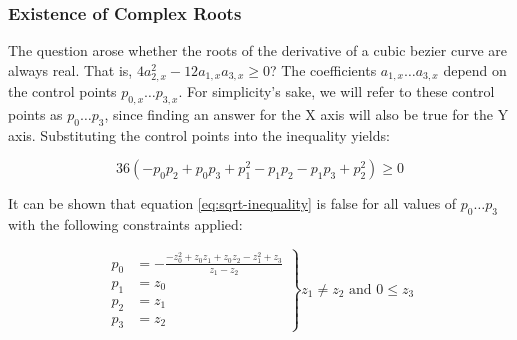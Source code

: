 \subsubsection{Existence of Complex Roots}

The question arose whether the roots of the derivative of a cubic bezier curve are always real. That is, $4 a_{2,x}^2 - 12 a_{1,x} a_{3,x} \ge 0$? The coefficients $a_{1,x} \ldots a_{3,x}$ depend on the control points $p_{0,x} \ldots p_{3,x}$. For simplicity's sake, we will refer to these control points as $p_0 \ldots p_3$, since finding an answer for the X axis will also be true for the Y axis. Substituting the control points into the inequality yields:

\begin{equation}
    36 \left(-p_0p_2 + p_0p_3 + p_1^2 - p_1p_2 - p_1p_3 + p_2^2\right) \ge 0
    \label{eq:sqrt-inequality}
\end{equation}

It can be shown that equation \ref{eq:sqrt-inequality} is false for all values of $p_0 \ldots p_3$ with the following constraints applied:

\begin{equation}
    \left.
    \begin{array}{ll}
        p_0 &= -\frac{-z_0^2 + z_0z_1 + z_0z_2 - z_1^2 + z_3}{z_1 - z_2} \\
        p_1 &= z_0 \\
        p_2 &= z_1 \\
        p_3 &= z_2
    \end{array}
    \right\}\text{$z_1 \ne z_2$ and $0 \le z_3$}
\end{equation}
